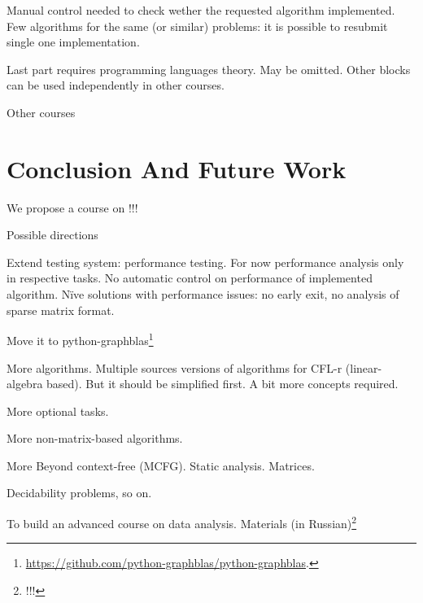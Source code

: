 \documentclass[sigconf]{acmart}
\begin{document}
Manual control needed to check wether the requested algorithm implemented.
Few algorithms for the same (or similar) problems: it is possible to resubmit single one implementation.

Last part requires programming languages theory. May be omitted. Other blocks can be used independently in other courses.

Other courses ~\cite{Figueira2022}

\section{Conclusion And Future Work}

We propose a course on !!! 

Possible directions 

Extend testing system: performance testing. 
For now performance analysis only in respective tasks.
No automatic control on performance of implemented algorithm. 
N\"ive solutions with performance issues: no early exit, no analysis of sparse matrix format.

Move it to python-graphblas\footnote{\url{https://github.com/python-graphblas/python-graphblas}.}

More algorithms.
Multiple sources versions of algorithms for CFL-r (linear-algebra based).
But it should be simplified first.
A bit more concepts required.

More optional tasks. 

More non-matrix-based algorithms.

More Beyond context-free (MCFG). 
Static analysis.
Matrices.

Decidability problems, so on.

To build an advanced course on data analysis. 
Materials (in Russian)\footnote{!!!}



\end{document}
